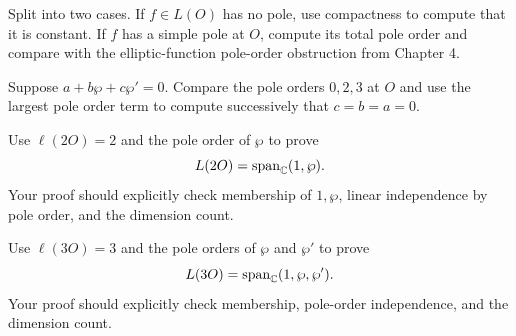 \begin{exercise}
Split into two cases.  If \(f\in L(O)\) has no pole, use compactness to compute
that it is constant.  If \(f\) has a simple pole at \(O\), compute its total
pole order and compare with the elliptic-function pole-order obstruction from
Chapter 4.
\end{exercise}

\begin{exercise}
Suppose \(a+b\wp+c\wp'=0\).  Compare the pole orders \(0,2,3\) at \(O\) and use
the largest pole order term to compute successively that \(c=b=a=0\).
\end{exercise}

\begin{exercise}
Use \(\ell(2O)=2\) and the pole order of \(\wp\) to prove
\[
  L(2O)=\operatorname{span}_{\mathbb{C}}(1,\wp).
\]
Your proof should explicitly check membership of \(1,\wp\), linear independence
by pole order, and the dimension count.
\end{exercise}

\begin{exercise}
Use \(\ell(3O)=3\) and the pole orders of \(\wp\) and \(\wp'\) to prove
\[
  L(3O)=\operatorname{span}_{\mathbb{C}}(1,\wp,\wp').
\]
Your proof should explicitly check membership, pole-order independence, and the
dimension count.
\end{exercise}

